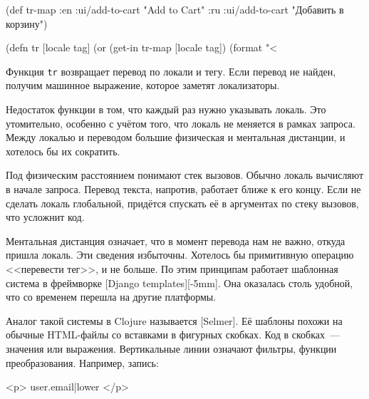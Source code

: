 \else

  \begin{clojure}
(def tr-map
  {:en {:ui/add-to-cart "Add to Cart"}
   :ru {:ui/add-to-cart "Добавить в корзину"}})

(defn tr [locale tag]
  (or (get-in tr-map [locale tag])
      (format "<%
  \end{clojure}

\fi


Функция \verb|tr| возвращает перевод по локали и тегу. Если перевод не найден,
получим машинное выражение, которое заметят локализаторы.

Недостаток функции в том, что каждый раз нужно указывать локаль. Это
утомительно, особенно с учётом того, что локаль не меняется в рамках
запроса. Между локалью и переводом большие физическая и ментальная
дистанции, и хотелось бы их сократить.


Под физическим расстоянием понимают стек вызовов. Обычно локаль вычисляют в
начале запроса. Перевод текста, напротив, работает ближе к его концу. Если не
сделать локаль глобальной, придётся спускать её в аргументах по стеку вызовов,
что усложнит код.


Ментальная дистанция означает, что в момент перевода нам не важно, откуда пришла
локаль. Эти сведения избыточны. Хотелось бы примитивную операцию <<перевести
тег>>, и не больше. По этим принципам работает шаблонная система в фреймворке
[Django templates][-5mm].
Она оказалась столь удобной, что со временем перешла на другие платформы.


Аналог такой системы в Clojure называется [Selmer].
Её шаблоны похожи на обычные HTML-файлы со вставками в фигурных скобках. Код в
скобках~--- значения или выражения. Вертикальные линии означают фильтры, функции
преобразования. Например, запись:

\begin{english}
  \begin{htmldjango}
<p>{{ user.email|lower }}</p>
  \end{htmldjango}
\end{english}

